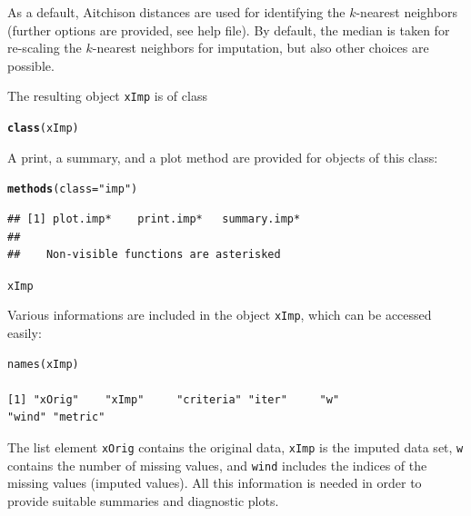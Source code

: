 \documentclass{scrartcl}\usepackage[]{graphicx}\usepackage[]{color}
\makeatletter
\newcommand{\hlstr}[1]{\textcolor[rgb]{0.192,0.494,0.8}{#1}}%
\newcommand{\hlstd}[1]{\textcolor[rgb]{0.345,0.345,0.345}{#1}}%
\newcommand{\hlkwc}[1]{\textcolor[rgb]{0.333,0.667,0.333}{#1}}%
\newcommand{\hlkwd}[1]{\textcolor[rgb]{0.737,0.353,0.396}{\textbf{#1}}}%
\newenvironment{kframe}{%
 \def\at@end@of@kframe{}%
 \ifinner\ifhmode%
  \def\at@end@of@kframe{\end{minipage}}%
  \begin{minipage}{\columnwidth}%
 \fi\fi%
 \def\FrameCommand##1{\hskip\@totalleftmargin \hskip-\fboxsep
 \colorbox{shadecolor}{##1}\hskip-\fboxsep
     \hskip-\linewidth \hskip-\@totalleftmargin \hskip\columnwidth}%
 \MakeFramed {\advance\hsize-\width
   \@totalleftmargin\z@ \linewidth\hsize
   \@setminipage}}%
 {\par\unskip\endMakeFramed%
 \at@end@of@kframe}
\newenvironment{knitrout}{}{} %
\makeatother
\begin{document}
As a default, Aitchison distances are used for identifying the $k$-nearest neighbors
(further options are provided, see help file). By default, the median is
taken for re-scaling the $k$-nearest neighbors for imputation, but also other
choices are possible.

The resulting object \texttt{xImp} is of class
\begin{knitrout}
\color{fgcolor}\begin{kframe}
\begin{alltt}
\hlkwd{class}\hlstd{(xImp)}
\end{alltt}


{\ttfamily\noindent\bfseries\color{errorcolor}{\#\# Error in eval(expr, envir, enclos): object 'xImp' not found}}\end{kframe}
\end{knitrout}

A print, a summary, and a plot method are provided for objects of this class:
\begin{knitrout}
\color{fgcolor}\begin{kframe}
\begin{alltt}
\hlkwd{methods}\hlstd{(}\hlkwc{class} \hlstd{=} \hlstr{"imp"}\hlstd{)}
\end{alltt}
\begin{verbatim}
## [1] plot.imp*    print.imp*   summary.imp*
## 
##    Non-visible functions are asterisked
\end{verbatim}
\begin{alltt}
\hlstd{xImp}
\end{alltt}


{\ttfamily\noindent\bfseries\color{errorcolor}{\#\# Error in eval(expr, envir, enclos): object 'xImp' not found}}\end{kframe}
\end{knitrout}

Various informations are included in the object \texttt{xImp}, which can be accessed easily:

\begin{verbatim}
names(xImp)

[1] "xOrig"    "xImp"     "criteria" "iter"     "w"
"wind" "metric"
\end{verbatim} 

The list element \texttt{xOrig} contains the original data, \texttt{xImp}
is the imputed data set, \texttt{w} contains the number of missing values,
and \texttt{wind} includes the indices of the missing values
(imputed values).
All this information is needed in order to provide suitable summaries and
diagnostic plots.
\end{document}
